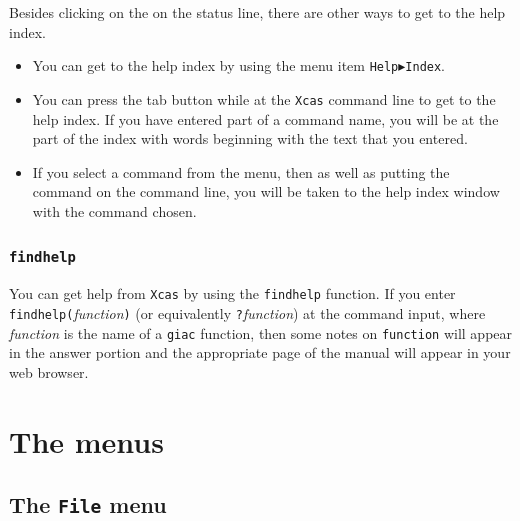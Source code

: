 \documentclass[a4paper,11pt]{book}
\begin{document}
Besides clicking on the  on the status line,
there are other ways to get to the help index.
\begin{itemize}
  \item
  You can get to the help index by using the menu item 
  \texttt{Help$\blacktriangleright$Index}.  
  
  \item 
  You can press the tab button while at the \texttt{Xcas} 
  command line to get to the help index.  If you have
  entered part of a command name, you will be at the part of the index
  with words beginning with the text that you entered.
  
  \item
  If you select a command from the menu, then as well as putting the
  command on the command line, you will be taken to the help index 
  window with the command chosen.
\end{itemize}

\subsubsection{\texttt{findhelp}}

You can get help from \texttt{Xcas} by using the 
\texttt{findhelp} function.  If you enter
\texttt{findhelp(}\textit{function}\texttt{)} (or equivalently
\texttt{?}\textit{function}) at the command input, where
\textit{function} is the name of a \texttt{giac} function, then some
notes on \texttt{function} will appear in the answer portion and the
appropriate page of the manual will appear in your web browser.

\section{The menus}

\subsection{The \texttt{File} menu}
\end{document}
